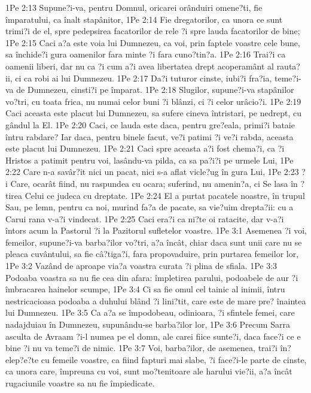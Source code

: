 1Pe 2:13  Supune?i-va, pentru Domnul, oricarei orânduiri omene?ti, fie împaratului, ca înalt stapânitor,
1Pe 2:14  Fie dregatorilor, ca unora ce sunt trimi?i de el, spre pedepsirea facatorilor de rele ?i spre lauda facatorilor de bine;
1Pe 2:15  Caci a?a este voia lui Dumnezeu, ca voi, prin faptele voastre cele bune, sa închide?i gura oamenilor fara minte ?i fara cuno?tin?a.
1Pe 2:16  Trai?i ca oamenii liberi, dar nu ca ?i cum a?i avea libertatea drept acoperamânt al rauta?ii, ci ca robi ai lui Dumnezeu.
1Pe 2:17  Da?i tuturor cinste, iubi?i fra?ia, teme?i-va de Dumnezeu, cinsti?i pe împarat.
1Pe 2:18  Slugilor, supune?i-va stapânilor vo?tri, cu toata frica, nu numai celor buni ?i blânzi, ci ?i celor urâcio?i.
1Pe 2:19  Caci aceasta este placut lui Dumnezeu, sa sufere cineva întristari, pe nedrept, cu gândul la El.
1Pe 2:20  Caci, ce lauda este daca, pentru gre?eala, primi?i bataie întru rabdare? Iar daca, pentru binele facut, ve?i patimi ?i ve?i rabda, aceasta este placut lui Dumnezeu.
1Pe 2:21  Caci spre aceasta a?i fost chema?i, ca ?i Hristos a patimit pentru voi, lasându-va pilda, ca sa pa?i?i pe urmele Lui,
1Pe 2:22  Care n-a savâr?it nici un pacat, nici s-a aflat vicle?ug în gura Lui,
1Pe 2:23  ?i Care, ocarât fiind, nu raspundea cu ocara; suferind, nu amenin?a, ci Se lasa în ?tirea Celui ce judeca cu dreptate.
1Pe 2:24  El a purtat pacatele noastre, în trupul Sau, pe lemn, pentru ca noi, murind fa?a de pacate, sa vie?uim drepta?ii: cu a Carui rana v-a?i vindecat.
1Pe 2:25  Caci era?i ca ni?te oi ratacite, dar v-a?i întors acum la Pastorul ?i la Pazitorul sufletelor voastre.
1Pe 3:1  Asemenea ?i voi, femeilor, supune?i-va barba?ilor vo?tri, a?a încât, chiar daca sunt unii care nu se pleaca cuvântului, sa fie câ?tiga?i, fara propovaduire, prin purtarea femeilor lor,
1Pe 3:2  Vazând de aproape via?a voastra curata ?i plina de sfiala.
1Pe 3:3  Podoaba voastra sa nu fie cea din afara: împletirea parului, podoabele de aur ?i îmbracarea hainelor scumpe,
1Pe 3:4  Ci sa fie omul cel tainic al inimii, întru nestricacioasa podoaba a duhului blând ?i lini?tit, care este de mare pre? înaintea lui Dumnezeu.
1Pe 3:5  Ca a?a se împodobeau, odinioara, ?i sfintele femei, care nadajduiau în Dumnezeu, supunându-se barba?ilor lor,
1Pe 3:6  Precum Sarra asculta de Avraam ?i-l numea pe el domn, ale carei fiice sunte?i, daca face?i ce e bine ?i nu va teme?i de nimic.
1Pe 3:7  Voi, barba?ilor, de asemenea, trai?i în?elep?e?te cu femeile voastre, ca fiind fapturi mai slabe, ?i face?i-le parte de cinste, ca unora care, împreuna cu voi, sunt mo?tenitoare ale harului vie?ii, a?a încât rugaciunile voastre sa nu fie împiedicate.
